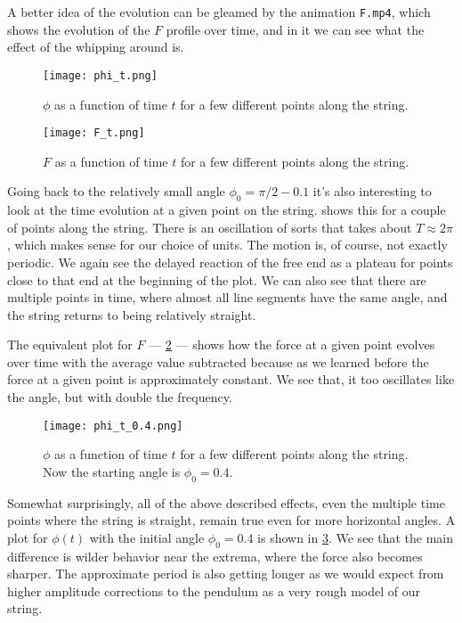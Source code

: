 \documentclass[10pt,a4paper,twocolumn]{article}
\begin{document}
A better idea of the evolution can be gleamed by the animation \texttt{F.mp4}, which shows the evolution of the $F$ profile over time, and in it we can see what the effect of the whipping around is.

\begin{figure}[!h]
    \centering
    \texttt{[image: phi\_t.png]}
    \caption{$\phi$ as a function of time $t$ for a few different points along the string.}
    \label{fig:phi_t}
\end{figure}

\begin{figure}[!b]
    \centering
    \texttt{[image: F\_t.png]}
    \caption{$F$ as a function of time $t$ for a few different points along the string.}
    \label{fig:F_t}
\end{figure}

Going back to the relatively small angle $\phi_0 = \pi/2 - 0.1$ it's also interesting to look at the time evolution at a given point on the string.  shows this for a couple of points along the string. There is an oscillation of sorts that takes about $T \approx 2\pi$, which makes sense for our choice of units. The motion is, of course, not exactly periodic. We again see the delayed reaction of the free end as a plateau for points close to that end at the beginning of the plot. We can also see that there are multiple points in time, where almost all line segments have the same angle, and the string returns to being relatively straight. 

The equivalent plot for $F$ --- \cref{fig:F_t} --- shows how the force at a given point evolves over time with the average value subtracted because as we learned before the force at a given point is approximately constant. We see that, it too oscillates like the angle, but with double the frequency.

\begin{figure}[!h]
    \centering
    \texttt{[image: phi\_t\_0.4.png]}
    \caption{$\phi$ as a function of time $t$ for a few different points along the string. Now the starting angle is $\phi_0=0.4$.}
    \label{fig:phi_t_alt}
\end{figure}

Somewhat surprisingly, all of the above described effects, even the multiple time points where the string is straight, remain true even for more horizontal angles. A plot for $\phi(t)$ with the initial angle $\phi_0 = 0.4$ is shown in \cref{fig:phi_t_alt}. We see that the main difference is wilder behavior near the extrema, where the force also becomes sharper. The approximate period is also getting longer as we would expect from higher amplitude corrections to the pendulum as a very rough model of our string. 
\end{document}

